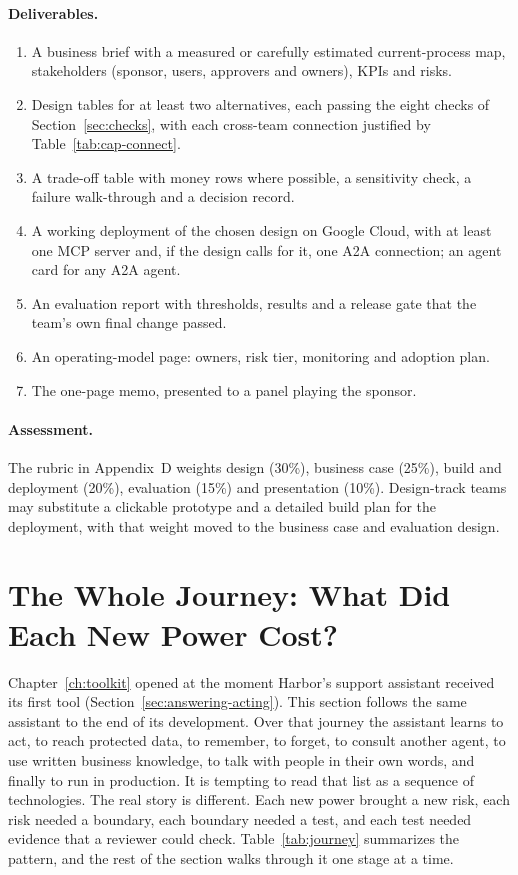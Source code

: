 \paragraph{Deliverables.}
\begin{enumerate}[itemsep=1pt]
  \item A business brief with a measured or carefully estimated current-process map, stakeholders (sponsor, users, approvers and owners), KPIs and risks.
  \item Design tables for at least two alternatives, each passing the eight checks of Section~\ref{sec:checks}, with each cross-team connection justified by Table~\ref{tab:cap-connect}.
  \item A trade-off table with money rows where possible, a sensitivity check, a failure walk-through and a decision record.
  \item A working deployment of the chosen design on Google Cloud, with at least one MCP server and, if the design calls for it, one A2A connection; an agent card for any A2A agent.
  \item An evaluation report with thresholds, results and a release gate that the team's own final change passed.
  \item An operating-model page: owners, risk tier, monitoring and adoption plan.
  \item The one-page memo, presented to a panel playing the sponsor.
\end{enumerate}

\paragraph{Assessment.} The rubric in Appendix~D weights design (30\%), business case (25\%), build and deployment (20\%), evaluation (15\%) and presentation (10\%). Design-track teams may substitute a clickable prototype and a detailed build plan for the deployment, with that weight moved to the business case and evaluation design.


\section{The Whole Journey: What Did Each New Power Cost?}
\label{sec:journey}

Chapter~\ref{ch:toolkit} opened at the moment Harbor's support assistant received its first tool (Section~\ref{sec:answering-acting}). This section follows the same assistant to the end of its development. Over that journey the assistant learns to act, to reach protected data, to remember, to forget, to consult another agent, to use written business knowledge, to talk with people in their own words, and finally to run in production. It is tempting to read that list as a sequence of technologies. The real story is different. Each new power brought a new risk, each risk needed a boundary, each boundary needed a test, and each test needed evidence that a reviewer could check. Table~\ref{tab:journey} summarizes the pattern, and the rest of the section walks through it one stage at a time.

